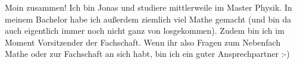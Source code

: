 \begin{multicols}{2}
{
Moin zusammen! Ich bin Jonas und studiere mittlerweile im Master Physik. In meinem Bachelor habe ich außerdem ziemlich viel Mathe gemacht (und bin da auch eigentlich immer noch nicht ganz von losgekommen). 
Zudem bin ich im Moment Vorsitzender der Fachschaft. Wenn ihr also Fragen zum Nebenfach Mathe oder zur Fachschaft an sich habt, bin ich ein guter Ansprechpartner :-)
}



\end{multicols}
